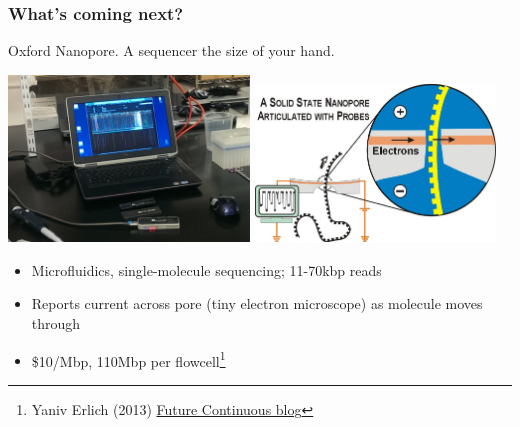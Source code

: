 \begin{frame}
  \frametitle{What's coming next?}
  Oxford Nanopore. A sequencer the size of your hand.
    \begin{center}
      \includegraphics[width=0.48\textwidth]{images/minion_run}\thinspace
      \includegraphics[width=0.48\textwidth]{images/nanopore_schematic}
    \end{center} 
    \begin{itemize}
      \item Microfluidics, single-molecule sequencing; 11-70kbp reads
      \item Reports current across pore (tiny electron microscope) as molecule moves through
      \item \$10/Mbp, 110Mbp per flowcell\footnote{\tiny{Yaniv Erlich (2013) \href{http://erlichya.tumblr.com/post/66376172948/hands-on-experience-with-oxford-nanopore-minion}{Future Continuous blog}}}
    \end{itemize}          
\end{frame}